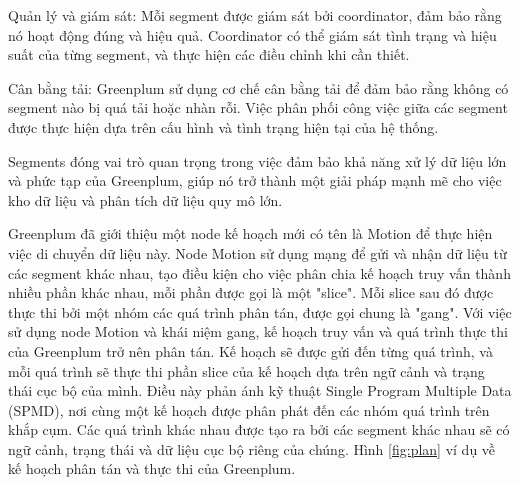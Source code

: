 \documentclass{article}[14pt]
\begin{document}
{{Quản lý và giám sát:
Mỗi segment được giám sát bởi coordinator, đảm bảo rằng nó hoạt động đúng
và hiệu quả. Coordinator có thể giám sát tình trạng và hiệu suất của từng segment, và thực hiện các điều chỉnh khi cần thiết.

Cân bằng tải: Greenplum sử dụng cơ chế cân bằng tải để đảm bảo rằng không có segment nào bị quá tải hoặc nhàn rỗi.
Việc phân phối công việc giữa các segment được thực hiện dựa trên cấu hình và tình trạng hiện tại của hệ thống.

Segments đóng vai trò quan trọng trong việc đảm bảo khả năng xử lý dữ liệu lớn và phức tạp của Greenplum, giúp nó trở thành một giải pháp mạnh mẽ cho việc kho dữ liệu và phân tích dữ liệu quy mô lớn.

Greenplum đã giới thiệu một node kế hoạch mới có tên là Motion để thực hiện việc di chuyển dữ liệu này. Node Motion sử dụng mạng để gửi và nhận dữ liệu từ các segment khác nhau, tạo điều kiện cho việc phân chia kế hoạch truy vấn thành nhiều phần khác nhau, mỗi phần được gọi là một "slice". Mỗi slice sau đó được thực thi bởi một nhóm các quá trình phân tán, được gọi chung là "gang". Với việc sử dụng node Motion và khái niệm gang, kế hoạch truy vấn và quá trình thực thi của Greenplum trở nên phân tán. Kế hoạch sẽ được gửi đến từng quá trình, và mỗi quá trình sẽ thực thi phần slice của kế hoạch dựa trên ngữ cảnh và trạng thái cục bộ của mình. Điều này phản ánh kỹ thuật Single Program Multiple Data (SPMD), nơi cùng một kế hoạch được phân phát đến các nhóm quá trình trên khắp cụm. Các quá trình khác nhau được tạo ra bởi các segment khác nhau sẽ có ngữ cảnh, trạng thái và dữ liệu cục bộ riêng của chúng. Hình \ref{fig:plan} ví dụ về kế hoạch phân tán và thực thi của Greenplum.

}}
\end{document}
